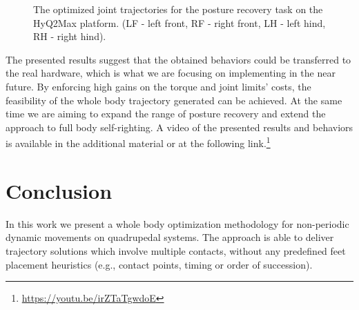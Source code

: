 \documentclass[usletter, 10pt, conference]{ieeeconf}      %
\begin{document}
\begin{figure}[h!]
\begin{subfigure}[b]{0.52\textwidth}
    \end{subfigure}
    \caption{The optimized joint trajectories for the posture recovery task on the 
HyQ2Max platform. (LF - left front, RF - right front, LH - left hind, RH - 
right hind).}
   \vspace*{-5mm}
    \label{fig:poserec_gauss}
\end{figure}

The presented results suggest that the obtained behaviors could be transferred to
the real hardware, which is what we are focusing on implementing in the near future.
By enforcing high gains on the torque and joint limits' costs, the feasibility of
the whole body trajectory generated can be achieved. 
At the same time we are aiming to expand the range of posture recovery and extend the approach
to full body self-righting. A video of the presented results and behaviors is available in the
additional material or at the following link.\footnote{\url{https://youtu.be/irZTaTgwdoE}}



\section{Conclusion}

In this work we present a whole body optimization methodology for non-periodic 
dynamic movements on quadrupedal systems. The approach is able to deliver 
trajectory solutions which involve multiple contacts, without any predefined
feet placement heuristics (e.g., contact points, timing or order of succession). 
\end{document}
